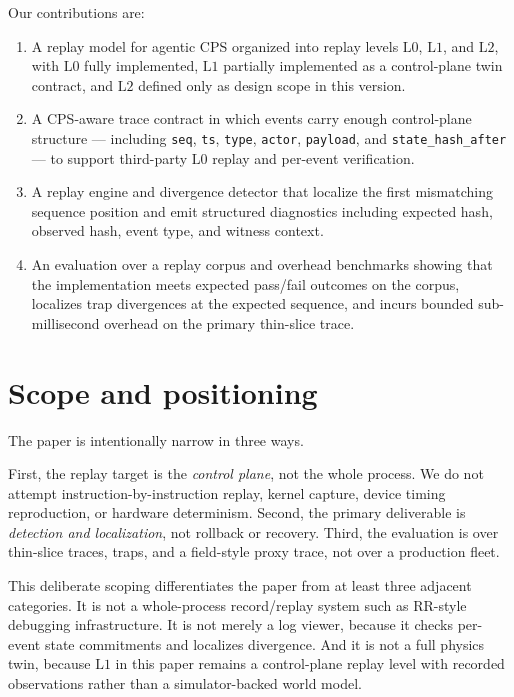 \documentclass[11pt]{article}
\newcommand{\field}[1]{\texttt{#1}}
\newcommand{\Lzero}{\ensuremath{\mathrm{L0}}}
\newcommand{\Lone}{\ensuremath{\mathrm{L1}}}
\newcommand{\Ltwo}{\ensuremath{\mathrm{L2}}}
\begin{document}
Our contributions are:

\begin{enumerate}[leftmargin=1.5em]
    \item A replay model for agentic CPS organized into replay levels \Lzero{}, \Lone{}, and \Ltwo{}, with \Lzero{} fully implemented, \Lone{} partially implemented as a control-plane twin contract, and \Ltwo{} defined only as design scope in this version.
    \item A CPS-aware trace contract in which events carry enough control-plane structure --- including \field{seq}, \field{ts}, \field{type}, \field{actor}, \field{payload}, and \field{state\_hash\_after} --- to support third-party \Lzero{} replay and per-event verification.
    \item A replay engine and divergence detector that localize the first mismatching sequence position and emit structured diagnostics including expected hash, observed hash, event type, and witness context.
    \item An evaluation over a replay corpus and overhead benchmarks showing that the implementation meets expected pass/fail outcomes on the corpus, localizes trap divergences at the expected sequence, and incurs bounded sub-millisecond overhead on the primary thin-slice trace.
\end{enumerate}

\section{Scope and positioning}

The paper is intentionally narrow in three ways.

First, the replay target is the \emph{control plane}, not the whole process. We do not attempt instruction-by-instruction replay, kernel capture, device timing reproduction, or hardware determinism. Second, the primary deliverable is \emph{detection and localization}, not rollback or recovery. Third, the evaluation is over thin-slice traces, traps, and a field-style proxy trace, not over a production fleet.

This deliberate scoping differentiates the paper from at least three adjacent categories. It is not a whole-process record/replay system such as RR-style debugging infrastructure. It is not merely a log viewer, because it checks per-event state commitments and localizes divergence. And it is not a full physics twin, because \Lone{} in this paper remains a control-plane replay level with recorded observations rather than a simulator-backed world model.
\end{document}
